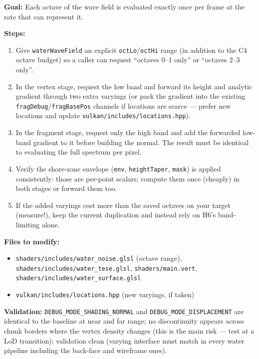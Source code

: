 \documentclass[11pt,a4paper]{article}
\begin{document}
\begin{tcolorbox}[promptbox={Prompt: Split the Wave Spectrum Between the Vertex and Fragment Rates}]
\textbf{Goal:} Each octave of the wave field is evaluated exactly once per frame at the rate that can represent it.

\textbf{Steps:}
\begin{enumerate}
    \item Give \texttt{waterWaveField} an explicit \texttt{octLo}/\texttt{octHi} range (in addition to the C4 octave
    budget) so a caller can request ``octaves 0--1 only'' or ``octaves 2--3 only''.
    \item In the vertex stage, request the low band and forward its height and analytic gradient through two extra
    varyings (or pack the gradient into the existing \texttt{fragDebug}/\texttt{fragBasePos} channels if locations are
    scarce --- prefer new locations and update \texttt{vulkan/includes/locations.hpp}).
    \item In the fragment stage, request only the high band and add the forwarded low-band gradient to it before
    building the normal. The result must be identical to evaluating the full spectrum per pixel.
    \item Verify the shore-zone envelope (\texttt{env}, \texttt{heightTaper}, \texttt{mask}) is applied consistently:
    those are per-point scalars; compute them once (cheaply) in both stages or forward them too.
    \item If the added varyings cost more than the saved octaves on your target (measure!), keep the current duplication
    and instead rely on H6's band-limiting alone.
\end{enumerate}

\textbf{Files to modify:}
\begin{itemize}
    \item \texttt{shaders/includes/water\_noise.glsl} (octave range), \texttt{shaders/includes/water\_tese.glsl},
    \texttt{shaders/main.vert}, \texttt{shaders/includes/water\_surface.glsl}
    \item \texttt{vulkan/includes/locations.hpp} (new varyings, if taken)
\end{itemize}

\textbf{Validation:} \texttt{DEBUG\_MODE\_SHADING\_NORMAL} and \texttt{DEBUG\_MODE\_DISPLACEMENT} are identical to the
baseline at near and far range; no discontinuity appears across chunk borders where the vertex density changes (this is
the main risk --- test at a LoD transition); validation clean (varying interface must match in every water pipeline
including the back-face and wireframe ones).
\end{tcolorbox}
\end{document}
